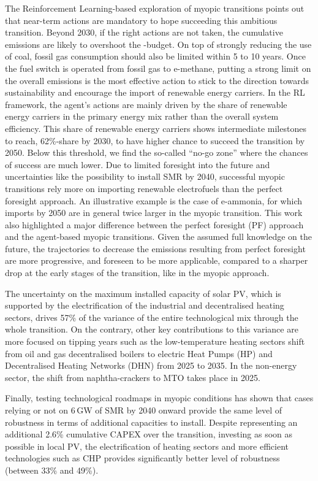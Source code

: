 The Reinforcement Learning-based exploration of myopic transitions points out that near-term actions are mandatory to hope succeeding this ambitious transition.  Beyond 2030, if the right actions are not taken, the cumulative emissions are likely to overshoot the -budget. On top of strongly reducing the use of coal, fossil gas consumption should also be limited within 5 to 10 years. Once the fuel switch is operated from fossil gas to e-methane, putting a strong limit on the overall emissions is the most effective action to stick to the direction towards sustainability and encourage the import of renewable energy carriers. In the \gls{RL} framework, the agent's actions are mainly driven by the share of renewable energy carriers in the primary energy mix rather than the overall system efficiency. This share of renewable energy carriers shows intermediate milestones to reach, 62\%-share by 2030, to have higher chance to succeed the transition by 2050. Below this threshold, we find the so-called ``no-go zone'' where the chances of success are much lower. Due to limited foresight into the future and uncertainties like the possibility to install \gls{SMR} by 2040, successful myopic transitions rely more on importing renewable electrofuels than the perfect foresight approach. An illustrative example is the case of e-ammonia, for which imports by 2050 are in general twice larger in the myopic transition. This work also highlighted a major difference between the perfect foresight (PF) approach and the agent-based myopic transitions. Given the assumed full knowledge on the future, the trajectories to decrease the  emissions resulting from perfect foresight are more progressive, and foreseen to be more applicable, compared to a sharper drop at the early stages of the transition, like in the myopic approach.

The uncertainty on the maximum installed capacity of solar \gls{PV}, which is supported by the electrification of the industrial and decentralised heating sectors, drives 57\% of the variance of the entire technological mix through the whole transition. On the contrary, other key contributions to this variance are more focused on tipping years such as the low-temperature heating sectors shift from oil and gas decentralised boilers to electric Heat Pumps (HP) and Decentralised Heating Networks (DHN) from 2025 to 2035. In the non-energy sector, the shift from naphtha-crackers to \acrfull{MTO} takes place in 2025.

Finally, testing technological roadmaps in myopic conditions has shown that cases relying or not on 6\,GW of \gls{SMR} by 2040 onward provide the same level of robustness in terms of additional capacities to install. Despite representing an additional 2.6\% cumulative CAPEX over the transition, investing as soon as possible in local \gls{PV}, the electrification of heating sectors and more efficient technologies such as \gls{CHP} provides significantly better level of robustness (between 33\% and 49\%).\\


